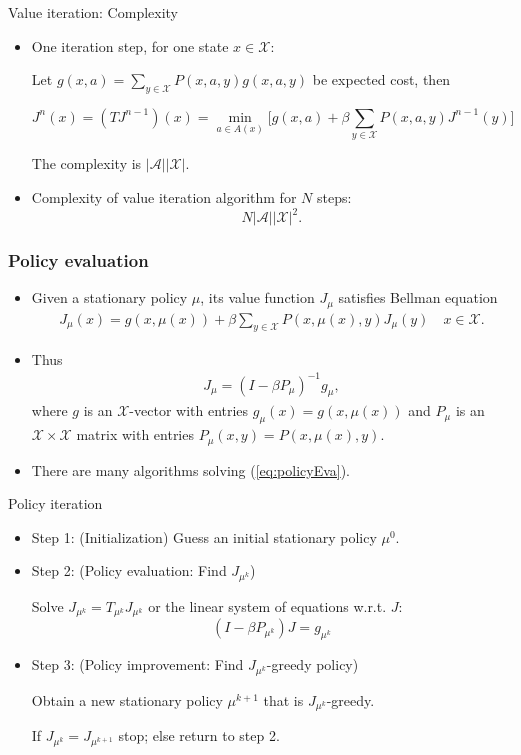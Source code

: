 \documentclass{beamer}
\def\X{{\mathcal X}}
\def\A{{\mathcal A}}
\begin{document}
\begin{frame}{Value iteration: Complexity}
\begin{itemize}
  \item One iteration step, for one state $x\in \X$:

  Let $g(x, a) =  \sum\limits_{y\in \X}P(x, a, y)g(x, a, y) $ be expected cost, then

  $$J^n(x) =(TJ^{n-1})(x)= \min\limits_{a\in A(x)} \Big[g(x, a) +\beta\sum\limits_{y\in \X} P(x, a, y)J^{n-1}(y)\Big]$$

  The complexity is $|\A||\X|$.
  \item Complexity of value iteration algorithm for $N$ steps:$$N|\A||\X|^2.$$
\end{itemize}
\end{frame}

\begin{frame}
  \frametitle{Policy evaluation}
  \begin{itemize}
  \item

  Given a stationary policy $\mu$, its value function $J_\mu$
 satisfies Bellman equation
    \begin{align}\label{eq:policyEva}
      J_\mu(x) = g(x, \mu(x)) + \beta \sum_{y\in \mathcal{X}} P(x,\mu(x), y) J_\mu(y) \quad x\in \mathcal{X}.
    \end{align}
  \item Thus
    \begin{align*}
      J_\mu = (I-\beta P_\mu)^{-1} g_\mu,
    \end{align*}
    where $g$ is an $\mathcal{X}$-vector with entries $g_\mu(x)=g(x, \mu(x))$ and $P_\mu$ is an $\mathcal{X}\times \mathcal{X}$ matrix with entries $P_\mu(x,y)=P(x, \mu(x), y)$.

\item There are many algorithms  solving (\ref{eq:policyEva}).

  \end{itemize}

\end{frame}
\begin{frame}{Policy iteration}
\begin{itemize}
  \item Step 1: (Initialization) Guess an initial stationary policy $\mu^0.$

  \item Step 2: (Policy evaluation: Find $J_{\mu^k}$)

  Solve $J_{\mu^k} = T_{\mu^k}J_{\mu^k}$ or the linear system of equations w.r.t. $J$:
  \begin{equation*}
  (I-\beta P_{\mu^k})J=g_{\mu^k}
  \end{equation*}

  \item Step 3: (Policy improvement: Find $J_{\mu^k}$-greedy policy)

  Obtain a new stationary policy $\mu^{k+1}$ that is $J_{\mu^k}$-greedy.

  If $J_{\mu^k} = J_{\mu^{k+1}}$ stop; else return to step 2.
\end{itemize}
\end{frame}
\end{document}
